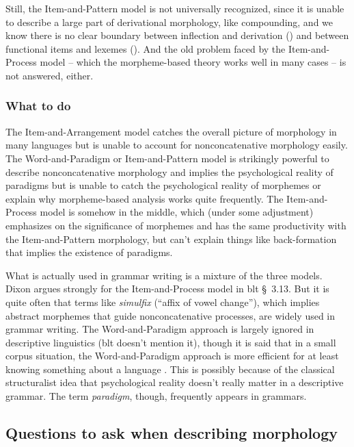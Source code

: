 \documentclass[UTF8, a4paper, oneside, scheme=plain]{ctexart}
\newcommand*{\citesec}[1]{\S~{#1}}
\newcommand*{\term}[1]{\emph{#1}}
\begin{document}
Still, the Item-and-Pattern model is not universally recognized,
since it is unable to describe a large part of derivational morphology, like compounding,
and we know there is no clear boundary between inflection and derivation 
()
and between functional items and lexemes 
(). 
And the old problem faced by the Item-and-Process model --
which the morpheme-based theory works well in many cases -- 
is not answered, either.

\subsubsection{What to do}\label{sec:practical-morphology}

The Item-and-Arrangement model catches the overall picture of morphology in many languages
but is unable to account for nonconcatenative morphology easily.
The Word-and-Paradigm or Item-and-Pattern model 
is strikingly powerful to describe nonconcatenative morphology
and implies the psychological reality of paradigms
but is unable to catch the psychological reality of morphemes
or explain why morpheme-based analysis works quite frequently.
The Item-and-Process model is somehow in the middle,
which (under some adjustment) emphasizes on the significance of morphemes
and has the same productivity with the Item-and-Pattern morphology,
but can't explain things like back-formation that implies the existence of paradigms.

What is actually used in grammar writing is a mixture of the three models.
Dixon argues strongly for the Item-and-Process model in \ac{blt} \citesec{3.13}.
But it is quite often that terms like \term{simulfix} (``affix of vowel change''),
which implies abstract morphemes that guide nonconcatenative processes,
are widely used in grammar writing.
The Word-and-Paradigm approach is largely ignored in descriptive linguistics
(\ac{blt} doesn't mention it),
though it is said that in a small corpus situation,
the Word-and-Paradigm approach is more efficient 
for at least knowing something about a language \citep{copot2022word}.
This is possibly because of the classical structuralist idea that
psychological reality doesn't really matter 
in a descriptive grammar.
The term \term{paradigm}, though, frequently appears in grammars.

\subsection{Questions to ask when describing morphology}
\end{document}
